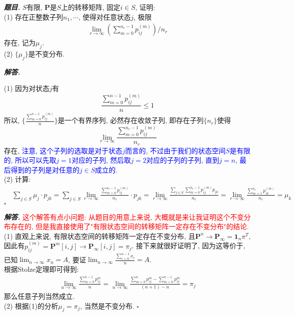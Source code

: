 \documentclass[10pt, a4paper, oneside]{ctexart}
\newenvironment{problem}{\begin{framed}\par\noindent\textbf{\textit{题目. }}}{\end{framed}\par}
\newenvironment{solution}{%
  \par\noindent\textbf{\textit{解答. }}\ignorespaces
}{%
  \hfill\ensuremath{\square}\par %
}
\begin{document}
\begin{problem}
$S$有限, $\mathbf{P}$是$S$上的转移矩阵, 固定$i\in S$, 证明:\\
(1) 存在正整数子列$n_1,\cdots$, 使得对任意状态$j$, 极限
\begin{align*}
    \lim_{r\to\infty} \left(\sum_{m=0}^{n_r-1}p_{ij}^{(m)}\right)/ n_r
\end{align*}
存在, 记为$\mu_j$.\\
(2) $\{\mu_j\}$是不变分布.
\end{problem}
\begin{solution}
(1) 因为对状态$j$有
$$\frac{\sum_{m=0}^{n-1}p_{ij}^{(m)}}{n}\leq 1$$
所以, $\{\frac{\sum_{m=0}^{n-1}p_{ij}^{(m)}}{n}\}$是一个有界序列, 必然存在收敛子列, 即存在子列$\{n_r\}$使得
$$\lim_{r\to \infty}\frac{\sum_{m=0}^{n_r-1}p_{ij}^{(m)}}{n_r}$$
存在, \textcolor{blue}{注意, 这个子列的选取是对于状态$j$而言的, 不过由于我们的状态空间$S$是有限的, 所以可以先取$j=1$对应的子列, 然后取$j=2$对应的子列的子列, 直到$j=n$, 最后得到的子列是对任意的$j\in S$成立的}.\\
(2) 计算:
\begin{align*}
    &\sum_{j\in S}\mu_j\cdot p_{jk}=\sum_{j\in S}\lim_{r\to \infty} \frac{\sum_{m=0}^{n_r-1}p_{ij}^{(m)}}{n_r}\cdot p_{jk}=\lim_{r\to\infty}\frac{\sum_{j\in S}\sum_{m=0}^{n_r-1}p_{ij}^{(m)}p_{jk}}{n_r}=\lim_{r\to \infty}\frac{\sum_{m=1}^{n_r}p_{ik}^{(m)}}{n_r}=\mu_k
\end{align*}
\end{solution}
\begin{solution}\textcolor{red}{这个解答有点小问题: 从题目的用意上来说, 大概就是来让我证明这个不变分布存在的, 但是我直接使用了"有限状态空间的转移矩阵一定存在不变分布"的结论.}\\
(1) 直观上来说, 有限状态空间的转移矩阵一定存在不变分布, 且$\mathbf{P}^n\to \mathbf{P}_{\infty}=\mathbf{1}_n\pi^T$, 因此有$p_{ij}^{(m)}=\mathbf{P}^m[i,j]\to \mathbf{P}_{\infty}[i,j]=\pi_j$. 接下来就很好证明了, 因为这等价于, 已知$\lim_{n\to \infty} x_{n}=A$, 要证$\lim_{n \to \infty} \frac{\sum_{i=0}^{n-1}x_{i}}{n}=A$.\\
根据Stolze定理即可得到:
\begin{align*}
    \lim_{n\to\infty} \frac{\sum_{m=0}^{n-1} p_{ij}^{m} }{n} =\lim_{n\to \infty} \frac{\sum_{m=0}^{n} p_{ij}^{m} - \sum_{m=0}^{n-1} p_{ij}^{m} }{(n+1)-n} = \pi_j
\end{align*}
那么任意子列当然成立.\\
(2) 根据(1)的分析$\mu_j=\pi_j$, 当然是不变分布.
\end{solution}
\end{document}
